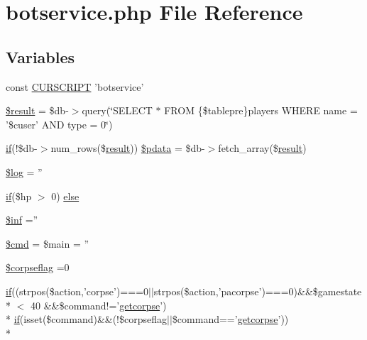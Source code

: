 \hypertarget{botservice_8php}{\section{botservice.\+php File Reference}
\label{botservice_8php}
}
\subsection*{Variables}
\begin{DoxyCompactItemize}
\item 
const \hyperlink{botservice_8php_a39c39f525eceb86cabc338804f230e80}{C\+U\+R\+S\+C\+R\+I\+P\+T} 'botservice'
\item 
\hyperlink{botservice_8php_ad72f7f7d7fd8794ce58b3da8977b8555}{\$result} = \$db-\/$>$query(\char`\"{}S\+E\+L\+E\+C\+T $\ast$ F\+R\+O\+M \{\$tablepre\}players W\+H\+E\+R\+E name = '\$cuser' A\+N\+D type = 0\char`\"{})
\item 
\hyperlink{login__old_8php_a4ac1118c2e44c513a674bc1793ba6c90}{if}(!\$db-\/$>$num\+\_\+rows(\$\hyperlink{templates_2install_8php_abdecde238169a1e34f68354fc9968af0}{result})) \hyperlink{botservice_8php_a6378350bbbdfdf1fdd8c8e1cd0607a8d}{\$pdata} = \$db-\/$>$fetch\+\_\+array(\$\hyperlink{templates_2install_8php_abdecde238169a1e34f68354fc9968af0}{result})
\item 
\hyperlink{botservice_8php_a9a2cf15a653aee8be437f7ae474cd494}{\$log} = ''
\item 
\hyperlink{login__old_8php_a4ac1118c2e44c513a674bc1793ba6c90}{if}(\$hp $>$ 0) \hyperlink{botservice_8php_a0b84dc7d8563744402546248257bb26a}{else}
\item 
\hyperlink{botservice_8php_ae2c1d0ffaf2c5f005f5b9a540e8a926f}{\$inf} =''
\item 
\hyperlink{botservice_8php_a9c87033fa49b61f753e3c263da5edeab}{\$cmd} = \$main = ''
\item 
\hyperlink{botservice_8php_ade2ba55b59e890fd631c6600a0b25bbe}{\$corpseflag} =0
\item 
\hyperlink{login__old_8php_a4ac1118c2e44c513a674bc1793ba6c90}{if}((strpos(\$action,'corpse')===0$\vert$$\vert$strpos(\$action,'pacorpse')===0)\&\&\$gamestate\\*
$<$ 40 \&\&\$command!='\hyperlink{itemmain_8func_8php_a88e57f5fcf96fbf8ba3f16b712c76d61}{getcorpse}') \\*
\hyperlink{login__old_8php_a4ac1118c2e44c513a674bc1793ba6c90}{if}(isset(\$command)\&\&(!\$corpseflag$\vert$$\vert$\$command=='\hyperlink{itemmain_8func_8php_a88e57f5fcf96fbf8ba3f16b712c76d61}{getcorpse}')) \\*

\end{DoxyCompactItemize}
